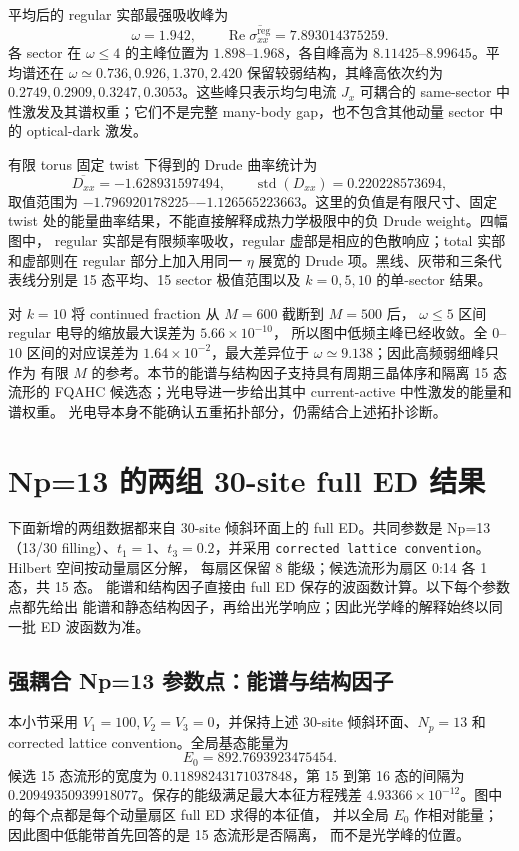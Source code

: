 \documentclass[11pt]{article}
\begin{document}
平均后的 regular 实部最强吸收峰为
\[
  \omega=1.942,\qquad
  \operatorname{Re}\overline{\sigma_{xx}^{\mathrm{reg}}}=7.893014375259.
\]
各 sector 在 \(\omega\le4\) 的主峰位置为 \(1.898\)--\(1.968\)，各自峰高为
\(8.11425\)--\(8.99645\)。平均谱还在
\(\omega\simeq0.736,0.926,1.370,2.420\) 保留较弱结构，其峰高依次约为
\(0.2749,0.2909,0.3247,0.3053\)。这些峰只表示均匀电流 \(J_x\) 可耦合的
same-sector 中性激发及其谱权重；它们不是完整 many-body gap，也不包含其他动量
sector 中的 optical-dark 激发。

有限 torus 固定 twist 下得到的 Drude 曲率统计为
\[
  \overline{D_{xx}}=-1.628931597494,\qquad
  \operatorname{std}(D_{xx})=0.220228573694,
\]
取值范围为 \(-1.796920178225\)--\(-1.126565223663\)。这里的负值是有限尺寸、固定
twist 处的能量曲率结果，不能直接解释成热力学极限中的负 Drude weight。四幅图中，
regular 实部是有限频率吸收，regular 虚部是相应的色散响应；total 实部和虚部则在
regular 部分上加入用同一 \(\eta\) 展宽的 Drude 项。黑线、灰带和三条代表线分别是
15 态平均、15 sector 极值范围以及 \(k=0,5,10\) 的单-sector 结果。

对 \(k=10\) 将 continued fraction 从 \(M=600\) 截断到 \(M=500\) 后，
\(\omega\le5\) 区间 regular 电导的缩放最大误差为 \(5.66\times10^{-10}\)，
所以图中低频主峰已经收敛。全 \(0\)--\(10\) 区间的对应误差为
\(1.64\times10^{-2}\)，最大差异位于 \(\omega\simeq9.138\)；因此高频弱细峰只作为
有限 \(M\) 的参考。本节的能谱与结构因子支持具有周期三晶体序和隔离 15 态流形的
FQAHC 候选态；光电导进一步给出其中 current-active 中性激发的能量和谱权重。
光电导本身不能确认五重拓扑部分，仍需结合上述拓扑诊断。

\clearpage
\section{Np=13 的两组 30-site full ED 结果}

下面新增的两组数据都来自 30-site 倾斜环面上的 full ED。共同参数是
Np=13（13/30 filling）、\(t_1=1\)、\(t_3=0.2\)，并采用
\texttt{corrected lattice convention}。Hilbert 空间按动量扇区分解，
每扇区保留 8 能级；候选流形为扇区 0:14 各 1 态，共 15 态。
能谱和结构因子直接由 full ED 保存的波函数计算。以下每个参数点都先给出
能谱和静态结构因子，再给出光学响应；因此光学峰的解释始终以同一批 ED 波函数为准。

\subsection{强耦合 Np=13 参数点：能谱与结构因子}

本小节采用 \(V_1=100,V_2=V_3=0\)，并保持上述
30-site 倾斜环面、\(N_p=13\) 和 corrected lattice convention。全局基态能量为
\[
  E_0=892.7693923475454 .
\]
候选 15 态流形的宽度为 \(0.11898243171037848\)，第 15 到第 16 态的间隔为
\(0.20949350939918077\)。保存的能级满足最大本征方程残差
\(4.93366\times10^{-12}\)。图中的每个点都是每个动量扇区 full ED 求得的本征值，
并以全局 \(E_0\) 作相对能量；因此图中低能带首先回答的是 15 态流形是否隔离，
而不是光学峰的位置。
\end{document}
